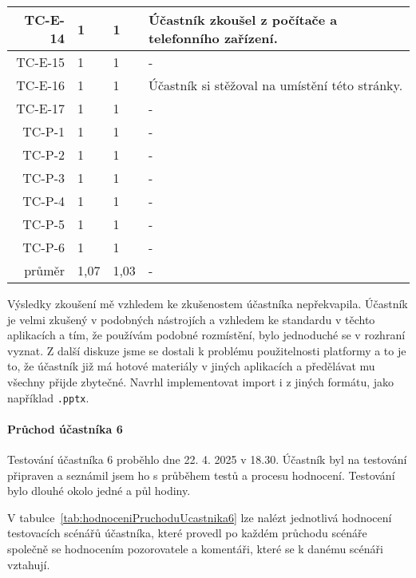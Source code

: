\begin{longtable}{r|p{2cm}|p{2cm}|p{6cm}}
TC-E-14  & 1 & 1 & Účastník zkoušel z počítače a telefonního zařízení. \\\hline
TC-E-15  & 1 & 1 & - \\\hline
TC-E-16  & 1 & 1 & Účastník si stěžoval na umístění této stránky. \\\hline
TC-E-17  & 1 & 1 & - \\\hline
TC-P-1   & 1 & 1 & - \\\hline
TC-P-2   & 1 & 1 & - \\\hline
TC-P-3   & 1 & 1 & - \\\hline
TC-P-4   & 1 & 1 & - \\\hline
TC-P-5   & 1 & 1 & - \\\hline
TC-P-6   & 1 & 1 & - \\\hline\hline
průměr   & 1,07 & 1,03 & - \\
\end{longtable}

Výsledky zkoušení mě vzhledem ke zkušenostem účastníka nepřekvapila.
Účastník je velmi zkušený v podobných nástrojích a vzhledem ke standardu v těchto aplikacích a tím, že používám podobné rozmístění, bylo jednoduché se v rozhraní vyznat.
Z další diskuze jsme se dostali k problému použitelnosti platformy a to je to, že účastník již má hotové materiály v jiných aplikacích a předělávat mu všechny přijde zbytečné.
Navrhl implementovat import i z jiných formátu, jako například \verb|.pptx|.

\paragraph{Průchod účastníka 6}

Testování účastníka 6 proběhlo dne 22. 4. 2025 v 18.30. 
Účastník byl na testování připraven a seznámil jsem ho s průběhem testů a procesu hodnocení. 
Testování bylo dlouhé okolo jedné a půl hodiny.

V tabulce~\ref{tab:hodnoceniPruchoduUcastnika6} lze nalézt jednotlivá hodnocení testovacích scénářů účastníka, které provedl po každém průchodu scénáře společně se hodnocením pozorovatele a komentáři, které se k danému scénáři vztahují.

